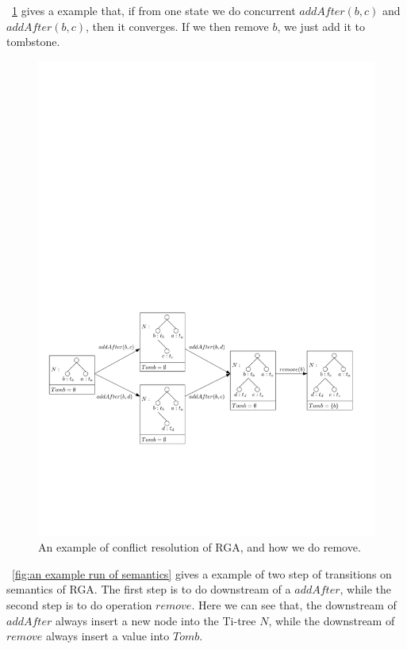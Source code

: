 \figurename~\ref{fig:how RGA works} gives a example that, if from one state we do concurrent $addAfter(b,c)$ and $addAfter(b,c)$, then it converges. If we then remove $b$, we just add it to tombstone. 

\begin{figure}[t]
  \centering
  \includegraphics[width=0.85 \textwidth]{figures/HowRGAWork.pdf}
\vspace{-10pt}
  \caption{An example of conflict resolution of RGA, and how we do remove.} 
  \label{fig:how RGA works}
\end{figure}


\figurename~\ref{fig:an example run of semantics} gives a example of two step of transitions on semantics of RGA. The first step is to do downstream of a $addAfter$, while the second step is to do operation $remove$. Here we can see that, the downstream of $addAfter$ always insert a new node into the Ti-tree $N$, while the downstream of $remove$ always insert a value into $Tomb$. 

